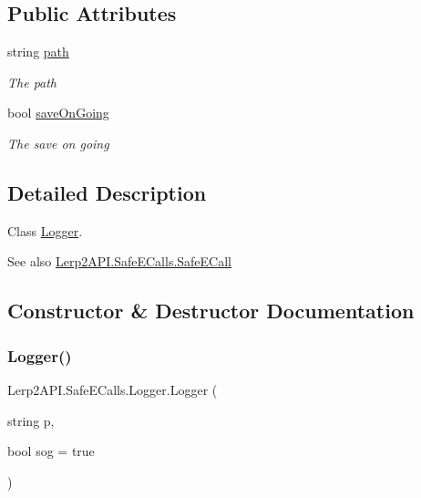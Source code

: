 \subsection*{Public Attributes}
\begin{DoxyCompactItemize}
\item 
string \hyperlink{class_lerp2_a_p_i_1_1_safe_e_calls_1_1_logger_ae8ca75777c2e35101dc87905cb3afb56}{path}
\begin{DoxyCompactList}\small\item\em The path \end{DoxyCompactList}\item 
bool \hyperlink{class_lerp2_a_p_i_1_1_safe_e_calls_1_1_logger_afe7d01ca1c989391d718005df4f61a5a}{save\+On\+Going}
\begin{DoxyCompactList}\small\item\em The save on going \end{DoxyCompactList}\end{DoxyCompactItemize}


\subsection{Detailed Description}
Class \hyperlink{class_lerp2_a_p_i_1_1_safe_e_calls_1_1_logger}{Logger}. 

\begin{DoxySeeAlso}{See also}
\hyperlink{class_lerp2_a_p_i_1_1_safe_e_calls_1_1_safe_e_call}{Lerp2\+A\+P\+I.\+Safe\+E\+Calls.\+Safe\+E\+Call}


\end{DoxySeeAlso}


\subsection{Constructor \& Destructor Documentation}
\mbox{\label{class_lerp2_a_p_i_1_1_safe_e_calls_1_1_logger_a98d4fb2ea03458b4a82ace76504e721f}} 
\subsubsection{\texorpdfstring{Logger()}{Logger()}}
{\footnotesize\ttfamily Lerp2\+A\+P\+I.\+Safe\+E\+Calls.\+Logger.\+Logger (\begin{DoxyParamCaption}\item[{string}]{p,  }\item[{bool}]{sog = {\ttfamily true} }\end{DoxyParamCaption})\hspace{0.3cm}{\ttfamily [inline]}}



